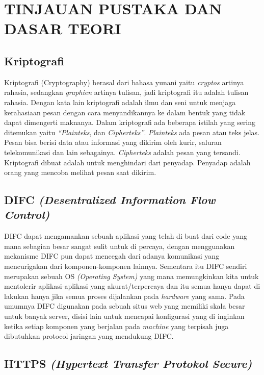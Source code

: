 \documentclass{jtetiproposalskripsi}
\begin{document}
	


\chapter{TINJAUAN PUSTAKA DAN DASAR TEORI}                

\section{Kriptografi}
Kriptografi (Cryptography) berasal dari bahasa yunani yaitu \emph{cryptos} artinya rahasia, sedangkan \emph{graphien} artinya tulisan, jadi kriptografi itu adalah tulisan rahasia. Dengan kata lain kriptografi adalah ilmu dan seni untuk menjaga kerahasiaan pesan dengan cara menyandikannya ke dalam bentuk yang tidak dapat dimengerti maknanya.
Dalam kriptografi ada beberapa istilah yang sering ditemukan yaitu \emph{“Plainteks}, dan \emph{Cipherteks”}. \emph{Plainteks} ada pesan atau teks jelas. Pesan bisa berisi data atau informasi yang dikirim oleh kurir, saluran telekomunikasi dan lain sebagainya. \emph{Cipherteks} adalah pesan yang tersandi. Kriptografi dibuat adalah untuk menghindari dari penyadap. Penyadap adalah orang yang mencoba melihat pesan saat dikirim.


\section{	DIFC \emph{(Desentralized Information Flow Control)}}
DIFC dapat mengamankan sebuah aplikasi yang telah di buat dari code yang mana sebagian besar sangat sulit untuk di percaya, dengan menggunakan mekanisme DIFC pun dapat mencegah dari adanya komunikasi yang mencurigakan dari komponen-komponen lainnya. Sementara itu DIFC sendiri merupakan sebuah OS \emph{(Operating System)} yang mana memungkinkan kita untuk mentolerir aplikasi-aplikasi yang akurat/terpercaya dan itu semua hanya dapat di lakukan hanya jika semua proses dijalankan pada \emph{hardware} yang sama. Pada umumnya DIFC digunakan pada sebuah situs web yang memiliki skala besar untuk banyak server, disisi lain untuk mencapai konfigurasi yang di inginkan ketika setiap komponen yang berjalan pada \emph{machine} yang terpisah juga dibutuhkan protocol jaringan yang mendukung DIFC. 


\section{HTTPS \emph{(Hypertext Transfer Protokol Secure)}}
\end{document}
